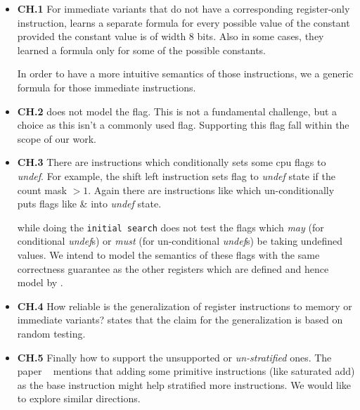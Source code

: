 \begin{itemize}
        
    
    \item  \textbf{CH.1} For immediate  variants that do not have a corresponding register-only instruction, \Strata  learns a separate formula for every possible value of the constant provided the constant value is of width 8 bits. Also in some cases, they learned a formula only for some of the possible constants.
    
    In order to have a more intuitive semantics of those instructions, we a generic formula for those  immediate instructions.

    \item \textbf{CH.2} \Strata does not model the  flag. This is not a fundamental challenge, but a choice as this isn't a commonly used flag. Supporting this flag fall within the scope of our work.
      
    \item \textbf{CH.3} There are instructions which conditionally sets some  cpu flags to \emph{undef}. For example, the shift left instruction  sets flag  to \emph{undef} state if the count mask $>1$. 
    Again there are instructions like  which un-conditionally puts flags like  \&  into \emph{undef} state.
 
    \Strata while doing the {\tt initial search} does not test the flags which \emph{may} (for conditional \emph{undef}s)  or \emph{must} (for un-conditional \emph{undef}s) be taking undefined values. We intend to model the semantics of these flags with the same correctness guarantee as the other registers which are defined and hence model by \Strata.
    
    \item \textbf{CH.4} How reliable is the generalization of register instructions to memory or immediate variants? \Strata states that the claim  for the generalization is based on random testing.
    
    \item \textbf{CH.5} Finally how to support the unsupported or \emph{un-stratified} ones. The paper ~\cite{Heule2016a} mentions that adding some primitive instructions (like saturated add) as the base instruction might help stratified more instructions. We would like to explore similar directions.   

\end{itemize} 

